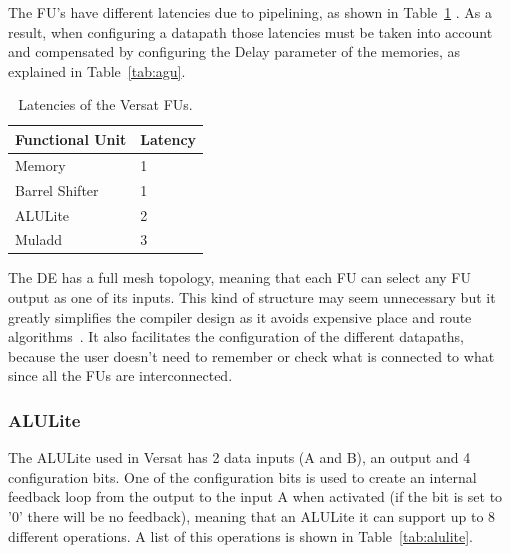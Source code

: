 The \ac{FU}'s have different latencies due to pipelining, as shown in
Table~\ref{tab:latencies} . As a result, when configuring a datapath those
latencies must be taken into account and compensated by configuring the Delay
parameter of the memories, as explained in Table~\ref{tab:agu}.

\begin{table}[!htb]
	\renewcommand{\arraystretch}{1.2} %
	\caption{Latencies of the Versat FUs.}
	\label{tab:latencies}
	\centering
	\begin{tabular}{ll}
		\toprule
		Functional Unit & Latency\\
		\midrule
		Memory          &       1\\
		Barrel Shifter  &       1\\
		ALULite         &       2\\
		Muladd          &       3\\
		\bottomrule
	\end{tabular}
\end{table}

The \ac{DE} has a full mesh topology, meaning that each FU can select any
\ac{FU} output as one of its inputs. This kind of structure may seem unnecessary
but it greatly simplifies the compiler design as it avoids expensive place and
route algorithms~\cite{sousa:versat2016}. It also facilitates the configuration
of the different datapaths, because the user doesn't need to remember or check
what is connected to what since all the \ac{FU}s are interconnected.

\subsubsection{ALULite}
\label{subsubsection:alulite}

The ALULite used in Versat has 2 data inputs (A and B), an output and 4
configuration bits. One of the configuration bits is used to create an internal
feedback loop from the output to the input A when activated (if the bit is set
to '0' there will be no feedback), meaning that an ALULite it can support up to
8 different operations. A list of this operations is shown in
Table~\ref{tab:alulite}.

